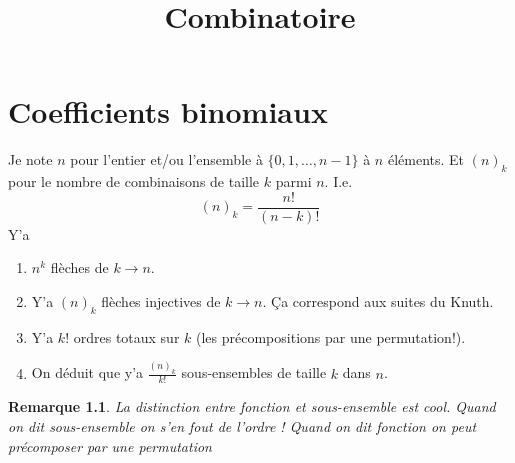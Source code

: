 \documentclass[a4paper,12pt]{book}
\title{Combinatoire}
\date{}
\theoremstyle{plain}
\newtheorem{rem}{Remarque}
\theoremstyle{definition}
\theoremstyle{remark}
\begin{document}
\maketitle
\tableofcontents
\chapter{Coefficients binomiaux}
Je note $n$ pour l'entier et/ou l'ensemble
à $\{0,1,\ldots,n-1\}$ à $n$ éléments. Et
$(n)_k$ pour le nombre de combinaisons de 
taille $k$ parmi $n$. I.e. 
\[(n)_k = \frac{n!}{(n-k)!}\]
Y'a
\begin{enumerate}
  \item $n^k$ flèches de $k\to n$.
  \item Y'a $(n)_k$ flèches injectives de $k\to n$.
    Ça correspond aux suites du Knuth.
  \item Y'a $k!$ ordres totaux sur $k$ (les précompositions
    par une permutation!).
  \item On déduit que y'a $\frac{(n)_k}{k!}$
    sous-ensembles de taille $k$ dans $n$.
\end{enumerate}
\begin{rem}
  La distinction entre fonction et sous-ensemble est cool. Quand
  on dit sous-ensemble on s'en fout de l'ordre ! Quand on dit
  fonction on peut précomposer par une permutation
\end{rem}
\end{document}
